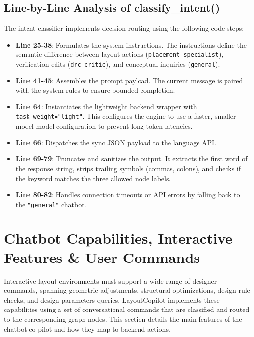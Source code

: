 \subsection{Line-by-Line Analysis of classify\_intent()}
The intent classifier implements decision routing using the following code steps:
\begin{itemize}
    \item \textbf{Line 25-38}: Formulates the system instructions. The instructions define the semantic difference between layout actions (\texttt{placement\_specialist}), verification edits (\texttt{drc\_critic}), and conceptual inquiries (\texttt{general}).
    \item \textbf{Line 41-45}: Assembles the prompt payload. The current message is paired with the system rules to ensure bounded completion.
    \item \textbf{Line 64}: Instantiates the lightweight backend wrapper with \texttt{task\_weight="light"}. This configures the engine to use a faster, smaller model model configuration to prevent long token latencies.
    \item \textbf{Line 66}: Dispatches the sync JSON payload to the language API.
    \item \textbf{Line 69-79}: Truncates and sanitizes the output. It extracts the first word of the response string, strips trailing symbols (commas, colons), and checks if the keyword matches the three allowed node labels.
    \item \textbf{Line 80-82}: Handles connection timeouts or API errors by falling back to the \texttt{"general"} chatbot.
\end{itemize}
\section[Chatbot Capabilities \& Features]{Chatbot Capabilities, Interactive Features \& User Commands}
\label{sec:chatbot_features}

Interactive layout environments must support a wide range of designer commands, spanning geometric adjustments, structural optimizations, design rule checks, and design parameters queries. LayoutCopilot implements these capabilities using a set of conversational commands that are classified and routed to the corresponding graph nodes. This section details the main features of the chatbot co-pilot and how they map to backend actions.

